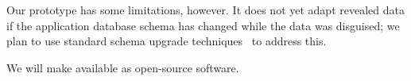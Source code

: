 %
%
Our prototype has some limitations, however.
%
%
It does not yet adapt revealed data if the application database schema has
changed while the data was disguised; we plan to use standard schema upgrade
techniques~\cite{xxx-from-noria} to address this.
%

%
We will make \sys available as open-source software.
%


%
%
